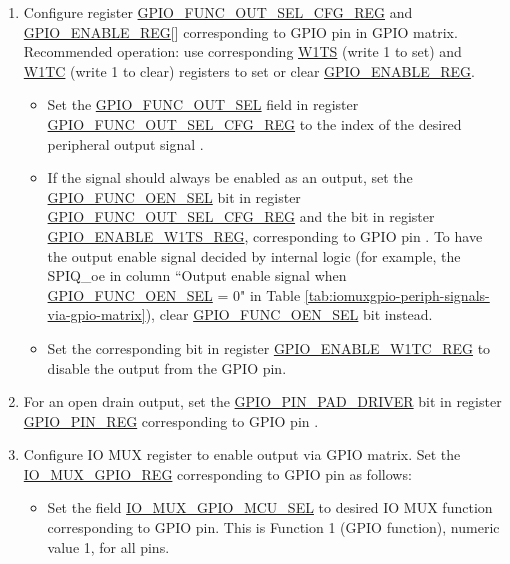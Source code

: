 \documentclass[main\_\_EN.tex]{subfiles}
\begin{document}
\begin{enumerate}
    \item Configure register \hyperref[regdesc:GPIOFUNCNOUTSELCFGREG]{GPIO\_FUNC\_OUT\_SEL\_CFG\_REG} and  \hyperref[regdesc:GPIOENABLEREG]{GPIO\_ENABLE\_REG}[] corresponding to GPIO pin  in GPIO matrix. Recommended operation: use corresponding \hyperref[regdesc:GPIOENABLEW1TSREG]{W1TS} (write 1 to set) and \hyperref[regdesc:GPIOENABLEW1TCREG]{W1TC} (write 1 to clear) registers to set or clear \hyperref[regdesc:GPIOENABLEREG]{GPIO\_ENABLE\_REG}.


    \begin{itemize}
        \item Set the \hyperref[fielddesc:GPIOFUNCNOUTSEL]{GPIO\_FUNC\_OUT\_SEL} field in register \hyperref[regdesc:GPIOFUNCNOUTSELCFGREG]{GPIO\_FUNC\_OUT\_SEL\_CFG\_REG} to the index of the desired peripheral output signal .
        \item If the signal should always be enabled as an output, set the \hyperref[fielddesc:GPIOFUNCNOENSEL]{GPIO\_FUNC\_OEN\_SEL} bit in register \hyperref[regdesc:GPIOFUNCNOUTSELCFGREG]{GPIO\_FUNC\_OUT\_SEL\_CFG\_REG} and the bit in register \hyperref[regdesc:GPIOENABLEW1TSREG]{GPIO\_ENABLE\_W1TS\_REG}, corresponding to GPIO pin . To have the output enable signal decided by internal logic (for example, the SPIQ\_oe in column ``Output enable signal when \hyperref[fielddesc:GPIOFUNCNOENSEL]{GPIO\_FUNC\_OEN\_SEL} = 0" in Table \ref{tab:iomuxgpio-periph-signals-via-gpio-matrix}), clear \hyperref[fielddesc:GPIOFUNCNOENSEL]{GPIO\_FUNC\_OEN\_SEL} bit instead.
       \item Set the corresponding bit in register \hyperref[regdesc:GPIOENABLEW1TCREG]{GPIO\_ENABLE\_W1TC\_REG} to disable the output from the GPIO pin.
    \end{itemize}
    \item For an open drain output, set the \hyperref[fielddesc:GPIOPINNPADDRIVER]{GPIO\_PIN\_PAD\_DRIVER} bit in register \hyperref[regdesc:GPIOPINNREG]{GPIO\_PIN\_REG} corresponding to GPIO pin .
    \item Configure IO MUX register to enable output via GPIO matrix. Set the \hyperref[regdesc:IOMUXGPIONREG]{IO\_MUX\_GPIO\_REG} corresponding to GPIO pin  as follows:
    \begin{itemize}
        \item Set the field \hyperref[fielddesc:IOMUXGPIONMCUSEL]{IO\_MUX\_GPIO\_MCU\_SEL} to desired IO MUX function corresponding to GPIO pin. This is Function 1 (GPIO function), numeric value 1, for all pins.

\end{itemize}
\end{enumerate}
\end{document}
